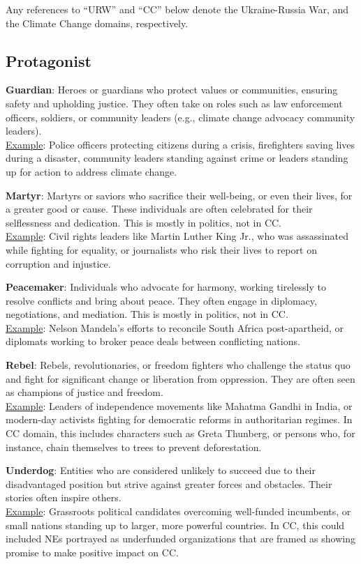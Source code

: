 Any references to ``URW'' and ``CC'' below denote the Ukraine-Russia War, and the Climate Change domains, respectively.

\subsection{Protagonist}

\textbf{Guardian}: Heroes or guardians who protect values or communities, ensuring safety and upholding justice. They often take on roles such as law enforcement officers, soldiers, or community leaders (e.g., climate change advocacy community leaders). 
\\\underline{Example}: Police officers protecting citizens during a crisis, firefighters saving lives during a disaster, community leaders standing against crime or leaders standing up for action to address climate change. 

\textbf{Martyr}: Martyrs or saviors who sacrifice their well-being, or even their lives, for a greater good or cause. These individuals are often celebrated for their selflessness and dedication. This is mostly in politics, not in CC.
\\\underline{Example}: Civil rights leaders like Martin Luther King Jr., who was assassinated while fighting for equality, or journalists who risk their lives to report on corruption and injustice. 

\textbf{Peacemaker}: Individuals who advocate for harmony, working tirelessly to resolve conflicts and bring about peace. They often engage in diplomacy, negotiations, and mediation. This is mostly in politics, not in CC.
\\\underline{Example}: Nelson Mandela's efforts to reconcile South Africa post-apartheid, or diplomats working to broker peace deals between conflicting nations. 

\textbf{Rebel}: Rebels, revolutionaries, or freedom fighters who challenge the status quo and fight for significant change or liberation from oppression. They are often seen as champions of justice and freedom. 
\\\underline{Example}: Leaders of independence movements like Mahatma Gandhi in India, or modern-day activists fighting for democratic reforms in authoritarian regimes. In CC domain, this includes characters such as Greta Thunberg, or persons who, for instance, chain themselves to trees to prevent deforestation.

\textbf{Underdog}: Entities who are considered unlikely to succeed due to their disadvantaged position but strive against greater forces and obstacles. Their stories often inspire others. 
\\\underline{Example}: Grassroots political candidates overcoming well-funded incumbents, or small nations standing up to larger, more powerful countries. In CC, this could included NEs portrayed as underfunded organizations that are framed as showing promise to make positive impact on CC. 



